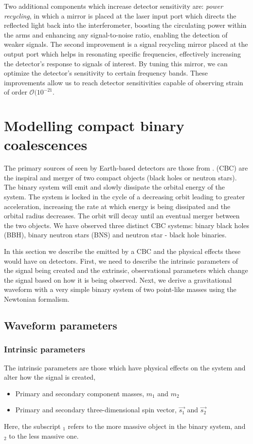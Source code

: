 Two additional components which increase detector sensitivity are: \textit{power recycling}, in which a mirror is placed at the laser input port which directs the reflected light back into the interferometer, boosting the circulating power within the arms and enhancing any signal-to-noise ratio, enabling the detection of weaker \gwadj signals. The second improvement is a signal recycling mirror placed at the output port which helps in resonating specific \gwadj frequencies, effectively increasing the detector's response to signals of interest. By tuning this mirror, we can optimize the detector's sensitivity to certain frequency bands. These improvements allow us to reach detector sensitivities capable of observing strain of order $\mathcal{O}(10^{-21}$. 

\section{\label{1:sec:modelling_CBC}Modelling compact binary coalescences}

The primary sources of \gws seen by Earth-based \gwadj detectors are those from \cbcs. \Cbcs (CBC) are the inspiral and merger of two compact objects (black holes or neutron stars). The binary system will emit \gws and slowly dissipate the orbital energy of the system. The system is locked in the cycle of a decreasing orbit leading to greater acceleration, increasing the rate at which energy is being dissipated and the orbital radius decreases. The orbit will decay until an eventual merger between the two objects. We have observed three distinct CBC systems: binary black holes (BBH), binary neutron stars (BNS) and neutron star - black hole binaries. 

In this section we describe the \gws emitted by a CBC and the physical effects these would have on \gwadj detectors. First, we need to describe the intrinsic parameters of the \gwadj signal being created and the extrinsic, observational parameters which change the signal based on how it is being observed. Next, we derive a gravitational waveform with a very simple binary system of two point-like masses using the Newtonian formalism.

\subsection{\label{1:sec:CBC-parameters}Waveform parameters}

\subsubsection{Intrinsic parameters}
The intrinsic parameters are those which have physical effects on the system and alter how the \gwadj signal is created,
\begin{itemize}
   \item Primary and secondary component masses, $m_{1}$ and $m_{2}$
   \item Primary and secondary three-dimensional spin vector, $\vec{s_{1}}$ and $\vec{s_{2}}$
\end{itemize}
Here, the subscript $_1$ refers to the more massive object in the binary system, and $_2$ to the less massive one.

